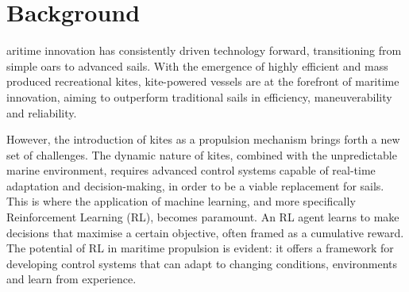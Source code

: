 %

%
\let\textcircled=\pgftextcircled\chapter{Background}\label{chap:background}






aritime innovation has consistently driven technology forward, transitioning from simple oars to advanced sails. With the emergence of highly efficient and mass produced recreational kites, kite-powered vessels are at the forefront of maritime innovation, aiming to outperform traditional sails in efficiency, maneuverability and reliability.

However, the introduction of kites as a propulsion mechanism brings forth a new set of challenges. The dynamic nature of kites, combined with the unpredictable marine environment, requires advanced control systems capable of real-time adaptation and decision-making, in order to be a viable replacement for sails. This is where the application of machine learning, and more specifically Reinforcement Learning (RL), becomes paramount. An RL agent learns to make decisions that maximise a certain objective, often framed as a cumulative reward. The potential of RL in maritime propulsion is evident: it offers a framework for developing control systems that can adapt to changing conditions, environments and learn from experience. 

